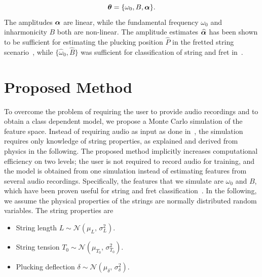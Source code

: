 \documentclass{article}
\begin{document}
\begin{sloppy}
\begin{equation}\label{eq:theta_parameters}
  \text{\boldmath$\theta$} = \{\omega_0, B, \text{\boldmath$\alpha$}\}.
\end{equation}
The amplitudes $\text{\boldmath$\alpha$}$ are linear, while the fundamental frequency $\omega_0$ and inharmonicity $B$ both are non-linear. 
The amplitude estimates $\text{\boldmath${\widehat\alpha}$}$ has been shown to be sufficient for estimating the plucking position $\widehat{P}$ in the fretted string scenario~\cite{hjerrild::icassp19}, while $\{\widehat\omega_0, \widehat B \} $ was sufficient for classification of string and fret in~\cite{barbancho:inharmonicity_tablature,michelson2018_aes}.%
%
%
%
\section{Proposed Method}
%
To overcome the problem of requiring the user to provide audio recordings and to obtain a class dependent model, we propose a  Monte Carlo simulation of the feature space. Instead of requiring audio as input as done in~\cite{abesser:automatic_string_detection_ml,barbancho:inharmonicity_tablature,michelson2018_aes,hjerrild::icassp19}, the simulation requires only knowledge of string properties, as explained and derived from physics in the following. The proposed method implicitly increases computational efficiency on two levels; the user is not required to record audio for training, and the model is obtained from one simulation instead of estimating features from several audio recordings. Specifically, the features that we simulate are ${\omega}_0$ and $B$, which have been proven useful for string and fret classification~\cite{barbancho:inharmonicity_tablature, michelson2018_aes,hjerrild::icassp19}. In the following, we assume the physical properties of the strings are normally distributed random variables. The string properties are
\begin{itemize}
    \item String length $L \sim \mathcal{N}(\mu_{L}, \,\sigma_{L}^{2} ) $.
    \item String tension $T_0 \sim \mathcal{N}(\mu_{T_0},\,\sigma_{T_0}^{2})$.
    \item Plucking deflection $\delta \sim \mathcal{N}(\mu_{\delta},\,\sigma_{\delta}^{2})$.


\end{itemize}
\end{sloppy}
\end{document}
